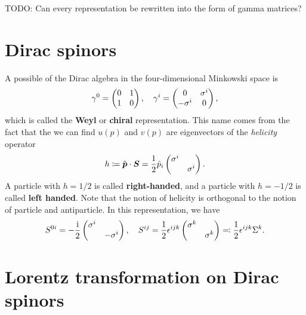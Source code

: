 \documentclass[hyperref, a4paper]{article}
\newcommand*{\ii}{\mathrm{i}}
\newcommand*{\concept}[1]{{\textbf{#1}}}
\begin{document}
TODO: Can every representation be rewritten into the form of gamma matrices?

\section{Dirac spinors}

A possible of the Dirac algebra in the four-dimensional Minkowski space is
\begin{equation}
    \gamma^0 = \pmqty{0 & 1 \\ 1 & 0}, \quad \gamma^i = \pmqty{ 0 & \sigma^i \\ - \sigma^i & 0 },
\end{equation}
which is called the \concept{Weyl} or \concept{chiral} representation. This name comes from the fact that the 
we can find $u(p)$ and $v(p)$ are eigenvectors of the \emph{helicity} operator 
\begin{equation}
    h \coloneqq \hat{\vb*{p}} \cdot \vb*{S} = \frac{1}{2} \hat{p}_i \pmqty{\dmat{\sigma^i, \sigma^i}}.
\end{equation}
A particle with $h = 1/2$ is called \concept{right-handed}, and a particle with $h = - 1/2$ is called 
\concept{left handed}. Note that the notion of helicity is orthogonal to the notion of particle and antiparticle.
In this representation, we have 
\begin{equation}
    S^{0 i} = - \frac{\ii}{2} \pmqty{\dmat{\sigma^i, - \sigma^i}}, \quad 
    S^{ij} = \frac{1}{2} \epsilon^{ijk} \pmqty{\dmat{\sigma^k, \sigma^k}} \eqqcolon \frac{1}{2} \epsilon^{ijk} \Sigma^k.
    \label{eq:weyl-lorentz}
\end{equation}

\section{Lorentz transformation on Dirac spinors}
\end{document}
